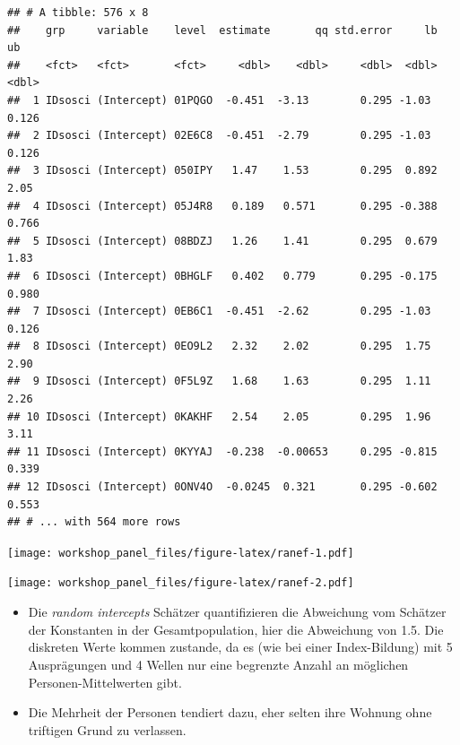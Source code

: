 \documentclass[
]{book}
\newenvironment{Shaded}{\begin{snugshade}}{\end{snugshade}}
\newcommand{\CommentTok}[1]{\textcolor[rgb]{0.56,0.35,0.01}{\textit{#1}}}
\newcommand{\DataTypeTok}[1]{\textcolor[rgb]{0.13,0.29,0.53}{#1}}
\newcommand{\DecValTok}[1]{\textcolor[rgb]{0.00,0.00,0.81}{#1}}
\newcommand{\FloatTok}[1]{\textcolor[rgb]{0.00,0.00,0.81}{#1}}
\newcommand{\KeywordTok}[1]{\textcolor[rgb]{0.13,0.29,0.53}{\textbf{#1}}}
\newcommand{\NormalTok}[1]{#1}
\newcommand{\OperatorTok}[1]{\textcolor[rgb]{0.81,0.36,0.00}{\textbf{#1}}}
\newcommand{\StringTok}[1]{\textcolor[rgb]{0.31,0.60,0.02}{#1}}
\providecommand{\tightlist}{%
  \setlength{\itemsep}{0pt}\setlength{\parskip}{0pt}}
\begin{document}
\begin{verbatim}
## # A tibble: 576 x 8
##    grp     variable    level  estimate       qq std.error     lb    ub
##    <fct>   <fct>       <fct>     <dbl>    <dbl>     <dbl>  <dbl> <dbl>
##  1 IDsosci (Intercept) 01PQGO  -0.451  -3.13        0.295 -1.03  0.126
##  2 IDsosci (Intercept) 02E6C8  -0.451  -2.79        0.295 -1.03  0.126
##  3 IDsosci (Intercept) 050IPY   1.47    1.53        0.295  0.892 2.05 
##  4 IDsosci (Intercept) 05J4R8   0.189   0.571       0.295 -0.388 0.766
##  5 IDsosci (Intercept) 08BDZJ   1.26    1.41        0.295  0.679 1.83 
##  6 IDsosci (Intercept) 0BHGLF   0.402   0.779       0.295 -0.175 0.980
##  7 IDsosci (Intercept) 0EB6C1  -0.451  -2.62        0.295 -1.03  0.126
##  8 IDsosci (Intercept) 0EO9L2   2.32    2.02        0.295  1.75  2.90 
##  9 IDsosci (Intercept) 0F5L9Z   1.68    1.63        0.295  1.11  2.26 
## 10 IDsosci (Intercept) 0KAKHF   2.54    2.05        0.295  1.96  3.11 
## 11 IDsosci (Intercept) 0KYYAJ  -0.238  -0.00653     0.295 -0.815 0.339
## 12 IDsosci (Intercept) 0ONV4O  -0.0245  0.321       0.295 -0.602 0.553
## # ... with 564 more rows
\end{verbatim}

\texttt{[image: workshop\_panel\_files/figure-latex/ranef-1.pdf]}

\begin{Shaded}
\end{Shaded}

\texttt{[image: workshop\_panel\_files/figure-latex/ranef-2.pdf]}

\begin{itemize}
\tightlist
\item
  Die \emph{random intercepts} Schätzer quantifizieren die Abweichung vom Schätzer der Konstanten in der Gesamtpopulation, hier die Abweichung von 1.5. Die diskreten Werte kommen zustande, da es (wie bei einer Index-Bildung) mit 5 Ausprägungen und 4 Wellen nur eine begrenzte Anzahl an möglichen Personen-Mittelwerten gibt.
\item
  Die Mehrheit der Personen tendiert dazu, eher selten ihre Wohnung ohne triftigen Grund zu verlassen.
\end{itemize}
\end{document}
